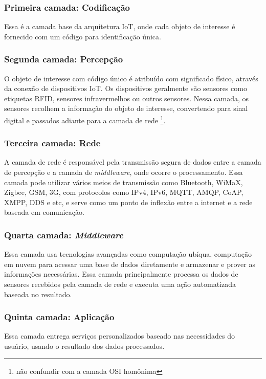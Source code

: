 \documentclass[tcc,capa]{texufpel}
\begin{document}
\subsubsection{Primeira camada: Codificação}
    Essa é a camada base da arquitetura IoT, onde cada objeto de interesse é fornecido com um código para identificação única.

\subsubsection{Segunda camada: Percepção}
    O objeto de interesse com código único é atribuído com significado físico, através da conexão de dispositivos IoT. Os dispositivos geralmente são sensores como etiquetas RFID, sensores infravermelhos ou outros sensores. Nessa camada, os sensores recolhem a informação do objeto de interesse, convertendo para sinal digital e passados adiante para a camada de rede \footnote{não confundir com a camada OSI homônima}.

\subsubsection{Terceira camada: Rede}
    A camada de rede é responsável pela transmissão segura de dados entre a camada de percepção e a camada de \textit{middleware}, onde ocorre o processamento. Essa camada pode utilizar vários meios de transmissão como Bluetooth, WiMaX, Zigbee, GSM, 3G, com protocolos como IPv4, IPv6, MQTT, AMQP, CoAP, XMPP, DDS e etc, e serve como um ponto de inflexão entre a internet e a rede baseada em comunicação.

\subsubsection{Quarta camada: \textit{Middleware}}
    Essa camada usa tecnologias avançadas como computação ubíqua, computação em nuvem para acessar uma base de dados diretamente e armazenar e prover as informações necessárias. Essa camada principalmente processa os dados de sensores recebidos pela camada de rede e executa uma ação automatizada baseada no resultado.

\subsubsection{Quinta camada: Aplicação}
    Essa camada entrega serviços personalizados baseado nas necessidades do usuário, usando o resultado dos dados processados.
\end{document}
